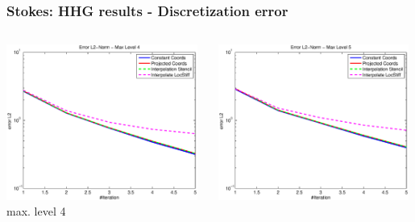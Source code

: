 \documentclass[t,compress=false,usepdftitle=false]{beamer}
\begin{document}
%
%
\begin{frame}\frametitle{Stokes: HHG results - Discretization error}

\begin{columns}[T] 
\begin{column}[T]{4.3cm} 
  \centering
  \includegraphics[width=0.98\textwidth]{spherestokes_errorEuc_level4}\\
  max. level 4
\end{column}\hfill
\begin{column}[T]{4.3cm} 
  \centering
  \includegraphics[width=0.98\textwidth]{spherestokes_errorEuc_level5}\\

\end{column}
\end{columns}
\end{frame}
\end{document}
